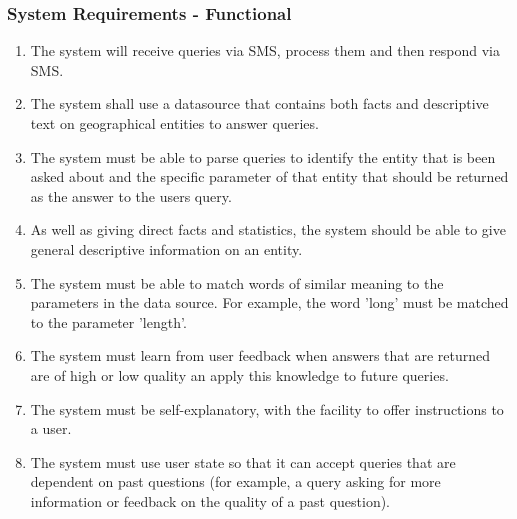 \documentclass{article}
\begin{document}
\subsubsection{System Requirements - Functional}
\begin{enumerate}
  \item The system will receive queries via SMS, process them and then respond via SMS.
  \item The system shall use a datasource that contains both facts and descriptive text on geographical entities to answer queries.
  \item The system must be able to parse queries to identify the entity that is been asked about and the specific parameter of that entity that should be returned as the answer to the users query.
  \item As well as giving direct facts and statistics, the system should be able to give general descriptive information on an entity.
  \item The system must be able to match words of similar meaning to the parameters in the data source.  For example, the word 'long' must be matched to the parameter 'length'.
  \item The system must learn from user feedback when answers that are returned are of high or low quality an apply this knowledge to future queries.
  \item The system must be self-explanatory, with the facility to offer instructions to a user.
  \item The system must use user state so that it can accept queries that are dependent on past questions (for example, a query asking for more information or feedback on the quality of a past question).
\end{enumerate}
\end{document}
